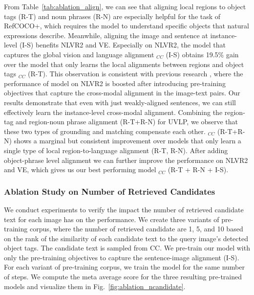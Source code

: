 From Table~\ref{tab:ablation_align}, we can see that aligning local regions to object tags (R-T) and noun phrases (R-N) are especially helpful for the task of RefCOCO+, which requires the model to understand specific objects that natural expressions describe. Meanwhile, aligning the image and sentence at instance-level (I-S) benefits NLVR2 and VE. Especially on NLVR2, the model that captures the global vision and language alignment \ModelName$_{CC}$ (I-S) obtains 19.5\% gain over the model that only learns the local alignments between regions and object tags \ModelName$_{CC}$ (R-T). This observation is consistent with previous research \cite{chen2020uniter}, where the performance of model on NLVR2 is boosted after introducing pre-training objectives that capture the cross-modal alignment in the image-text pairs. Our results demonstrate that even with just weakly-aligned sentences, we can still effectively learn the instance-level cross-modal alignment. 
Combining the region-tag and region-noun phrase alignment (R-T+R-N) for UVLP, we observe that these two types of grounding and matching compensate each other. \ModelName$_{CC}$ (R-T+R-N) shows a marginal but consistent improvement over models that only learn a single type of local region-to-language alignment (R-T, R-N). After adding object-phrase level alignment we can further improve the performance on NLVR2 and VE, which gives us our best performing model \ModelName$_{CC}$ (R-T + R-N + I-S). 

\subsubsection{Ablation Study on Number of Retrieved Candidates}
We conduct experiments to verify the impact the number of retrieved candidate text for each image has on the performance. We create three variants of pre-training corpus, where the number of retrieved candidate are 1, 5, and 10 based on the rank of the similarity of each candidate text to the query image's detected object tags. The candidate text is sampled from CC. We pre-train our {\ModelName } model with only the pre-training objectives to capture the sentence-image alignment (I-S). For each variant of pre-training corpus, we train the model for the same number of steps. We compute the meta average score for the three resulting pre-trained models and visualize them in Fig.~\ref{fig:ablation_ncandidate}. 


